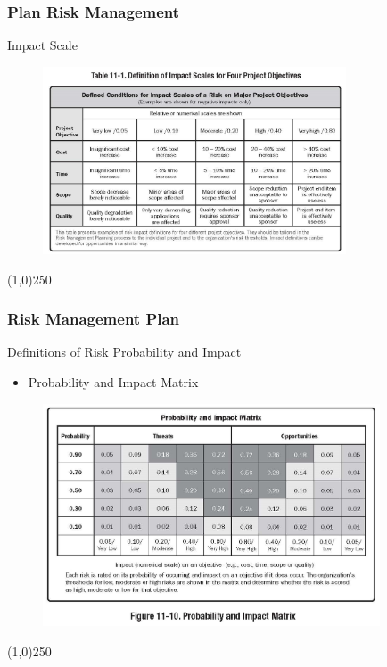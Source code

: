 \begin{frame}
\frametitle{Plan Risk Management}
Impact Scale
\begin{figure}
	\centering
		\includegraphics[width = 9cm]{images/Table11-1.jpg}
	\label{tab:11-1}
\end{figure}
\end{frame}\begin{center}\line(1,0){250}\end{center}






\begin{frame}
\frametitle{Risk Management Plan}
Definitions of Risk Probability and Impact
\begin{itemize}
	\item Probability and Impact Matrix
\end{itemize}
\begin{figure}
	\centering
		\includegraphics[width = 10cm]{images/Fig11-10.jpg}
	\label{fig:11-10}
\end{figure}
\end{frame}\begin{center}\line(1,0){250}\end{center}






